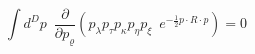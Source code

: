 \begin{equation}\label{dp5}
    \int d^Dp\,\,\,
        \frac{\partial}{\partial p_{\varrho}}
    \left(
        p_{\lambda}p_{\tau}p_{\kappa}p_{\eta}p_{\xi}\,\,\,
        e^{-\frac{1}{2}p\cdot R\cdot p}
    \right)
    =0
\end{equation}

